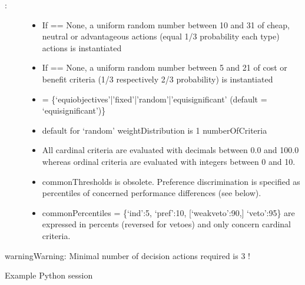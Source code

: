 \documentclass[a4paper,10pt,english]{sphinxhowto}
\begin{document}
\begin{description}
\item[{:}] \leavevmode\begin{itemize}
\item {} 
If  == None, a uniform random number between 10 and 31 of cheap, neutral or advantageous actions (equal 1/3 probability each type) actions is instantiated

\item {} 
If  == None, a uniform random number between 5 and 21 of cost or benefit criteria (1/3 respectively 2/3 probability) is instantiated

\item {} 
 = \{‘equiobjectives’|’fixed’|’random’|’equisignificant’ (default = ‘equisignificant’)\}

\item {} 
default  for ‘random’ weightDistribution is 1 \sphinxhyphen{} numberOfCriteria

\item {} 
All cardinal criteria are evaluated with decimals between 0.0 and 100.0 whereas ordinal criteria are evaluated with integers between 0 and 10.

\item {} 
commonThresholds is obsolete. Preference discrimination is specified as percentiles of concerned performance differences (see below).

\item {} 
commonPercentiles = \{‘ind’:5, ‘pref’:10, {[}‘weakveto’:90,{]} ‘veto’:95\} are expressed in percents (reversed for vetoes) and only concern cardinal criteria.

\end{itemize}

\end{description}

\begin{sphinxadmonition}{warning}{Warning:}
Minimal number of decision actions required is 3 !
\end{sphinxadmonition}

Example Python session
\end{document}
